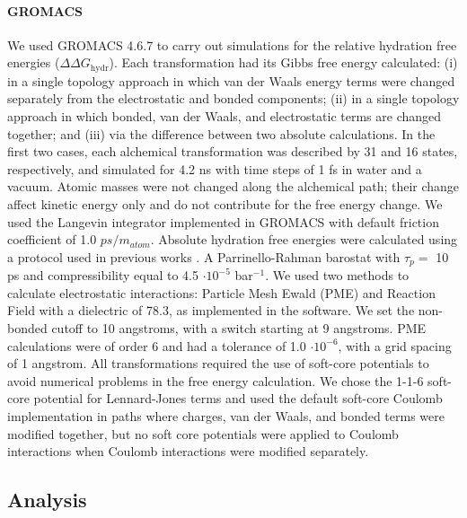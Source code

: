 \documentclass[journal=jctcce,manuscript=article]{achemso}
\begin{document}
\paragraph{GROMACS} We used GROMACS 4.6.7 to carry out simulations for 
the relative hydration free energies ($\Delta \Delta G_{\mathrm{hydr}}$).
Each transformation had its Gibbs free energy calculated: (i) in a single topology 
approach in which van der Waals energy terms were changed separately 
from the electrostatic and bonded components; (ii) in a single topology approach in which  
bonded, van der Waals, and electrostatic terms are changed together;  and (iii) via the difference 
between two absolute calculations.
In the first two cases, each alchemical transformation was described by 31 and 16 
states, respectively, and simulated for 4.2 ns with time steps of 1 fs in water and a vacuum. 
Atomic masses were not changed along the alchemical path;
their change affect kinetic energy only and do not contribute for the free energy change. 
We used the Langevin integrator implemented in GROMACS with default friction 
coefficient of 1.0 $ps/ m_{atom}$. 
Absolute hydration free energies were calculated using a protocol used in previous works \cite{duarte_ramos_matos_approaches_2017, mobley_freeSolv:_2014}.
A Parrinello-Rahman barostat with $\tau_p =$ 10 ps and compressibility equal to 4.5 $\cdot 10^{-5}$ bar$^{-1}$.
We used two methods to calculate electrostatic interactions: Particle Mesh Ewald (PME) 
and Reaction Field with a dielectric of 78.3, as implemented in the software. 
We set the non-bonded cutoff to 10 angstroms, with a switch starting at 9 angstroms. 
PME calculations were of order 6 and had a tolerance of 1.0 $\cdot 10^{-6}$, with a grid spacing of 1 angstrom. 
All transformations required the use of soft-core potentials to avoid numerical problems in the free energy calculation. 
We chose the 1-1-6 soft-core potential for Lennard-Jones 
terms and used the default soft-core Coulomb implementation in paths where charges, van der 
Waals, and bonded terms were modified together, but no soft core potentials were applied 
to Coulomb interactions when Coulomb interactions were modified separately.


\subsection{Analysis}
\label{sec:analysis}
\end{document}
